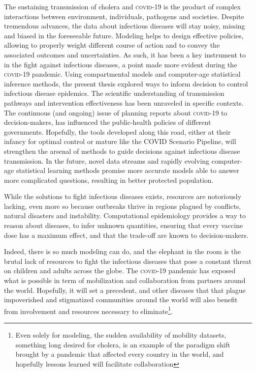 The sustaining transmission of cholera and \textsc{covid}-19 is the product of complex interactions between environment, individuals, pathogens and societies. Despite tremendous advances, the data about infectious diseases will stay noisy, missing and biased in the foreseeable future. Modeling helps to design effective policies, allowing to properly weight different course of action and to convey the associated outcomes and uncertainties. As such, it has been a key instrument to in the fight against infectious diseases, a point made more evident during the \textsc{covid}-19 pandemic. Using compartmental models and computer-age statistical inference methods, the present thesis explored ways to inform decision to control infectious disease epidemics. The scientific understanding of transmission pathways and intervention effectiveness has been unraveled in specific contexts. The continuous (and ongoing) issue of planning reports about \textsc{covid}-19 to decision-makers, has influenced the public-health policies of different governments. Hopefully, the tools developed along this road, either at their infancy for optimal control or mature like the COVID Scenario Pipeline, will  strengthen the arsenal of methods to guide decisions against infectious disease transmission.  In the future, novel data streams and rapidly evolving computer-age statistical learning methods promise more accurate models able to answer more complicated questions, resulting in better protected population.

While the solutions to fight infectious diseases exists, resources are notoriously lacking, even more so because outbreaks thrive in regions plagued by conflicts, natural disasters and instability.  Computational epidemiology provides a way to reason about diseases, to infer unknown quantities, ensuring that every vaccine dose has a maximum effect, and that the trade-off are known to decision-makers. %

Indeed, there is so much modeling can do, and the elephant in the room is the brutal lack of resources to fight the infectious diseases that pose a constant threat on children and adults across the globe. The \textsc{covid}-19 pandemic has exposed what is possible in term of mobilization and collaboration from partners around the world. Hopefully, it will set a precedent, and other diseases that that plague impoverished and stigmatized communities around the world will also benefit from involvement and resources necessary to eliminate\footnote[][-2\baselineskip]{Even solely for modeling, the sudden availability of mobility datasets, something long desired for cholera, is an example of the paradigm shift brought by a pandemic that affected every country in the world, and hopefully lessons learned will facilitate collaboration}. 

